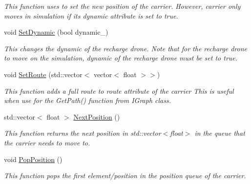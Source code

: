 \begin{DoxyCompactItemize}
\begin{DoxyCompactList}\small\item\em This function uses to set the new position of the carrier. However, carrier only moves in simulation if its dynamic attribute is set to true. \end{DoxyCompactList}\item 
void \hyperlink{classcsci3081_1_1RechargeDrone_a2c3e7c4f5c4ca78feef664fca810d0ea}{Set\+Dynamic} (bool dynamic\+\_\+)
\begin{DoxyCompactList}\small\item\em This changes the dynamic of the recharge drone. Note that for the recharge drone to move on the simulation, dynamic of the recharge drone must be set to true. \end{DoxyCompactList}\item 
void \hyperlink{classcsci3081_1_1RechargeDrone_a06c5c7bde0b661c5920ad9dc0e8e5420}{Set\+Route} (std\+::vector$<$ vector$<$ float $>$$>$)
\begin{DoxyCompactList}\small\item\em This function adds a full route to route attribute of the carrier This is useful when use for the Get\+Path() function from I\+Graph class. \end{DoxyCompactList}\item 
\mbox{\label{classcsci3081_1_1RechargeDrone_abf8979f7773a6a280eefedf344992356}} 
std\+::vector$<$ float $>$ \hyperlink{classcsci3081_1_1RechargeDrone_abf8979f7773a6a280eefedf344992356}{Next\+Position} ()
\begin{DoxyCompactList}\small\item\em This function returns the next position in std\+::vector$<$float$>$ in the queue that the carrier needs to move to. \end{DoxyCompactList}\item 
\mbox{\label{classcsci3081_1_1RechargeDrone_af4901b3bd3755500a4841a1318022359}} 
void \hyperlink{classcsci3081_1_1RechargeDrone_af4901b3bd3755500a4841a1318022359}{Pop\+Position} ()
\begin{DoxyCompactList}\small\item\em This function pops the first element/position in the position queue of the carrier. \end{DoxyCompactList}\item 
\mbox{\label{classcsci3081_1_1RechargeDrone_ac4b45136e2969ac25941d46a8ccdb83a}} 
$$
\end{DoxyCompactItemize}
